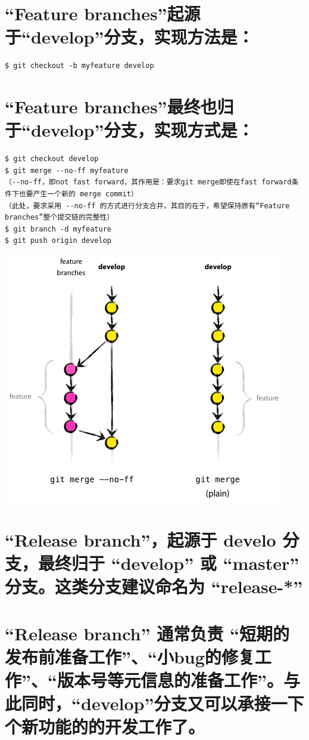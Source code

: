 \documentclass[11pt]{article}
\begin{document}
\section{“Feature branches”起源于“develop”分支，实现方法是：}
\label{sec-11}


\begin{verbatim}
$ git checkout -b myfeature develop
\end{verbatim}
\section{“Feature branches”最终也归于“develop”分支，实现方式是：}
\label{sec-12}


\begin{verbatim}
$ git checkout develop
$ git merge --no-ff myfeature
（--no-ff，即not fast forward，其作用是：要求git merge即使在fast forward条件下也要产生一个新的 merge commit）
（此处，要求采用 --no-ff 的方式进行分支合并，其目的在于，希望保持原有“Feature branches”整个提交链的完整性）
$ git branch -d myfeature
$ git push origin develop
\end{verbatim}
\includegraphics[width=.9\linewidth]{images/105048.png}
\section{“Release branch”，起源于 develo 分支，最终归于 “develop” 或 “master” 分支。这类分支建议命名为 “release-*”}
\label{sec-13}
\section{“Release branch” 通常负责 “短期的发布前准备工作”、“小bug的修复工作”、“版本号等元信息的准备工作”。与此同时，“develop”分支又可以承接一下个新功能的的开发工作了。}
\label{sec-14}
\end{document}
